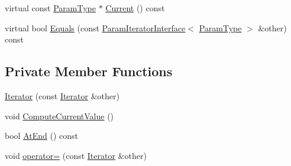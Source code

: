 \begin{DoxyCompactItemize}
\item 
virtual const \hyperlink{classtesting_1_1internal_1_1CartesianProductGenerator4_a99c0f82cb1095cf66d28100490e9fa39}{\-Param\-Type} $\ast$ \hyperlink{classtesting_1_1internal_1_1CartesianProductGenerator4_1_1Iterator_ab27aeab5db14a30f077a37989ce9261c}{\-Current} () const 
\item 
virtual bool \hyperlink{classtesting_1_1internal_1_1CartesianProductGenerator4_1_1Iterator_a8f18f9a017a12730cce28c07460bbc14}{\-Equals} (const \hyperlink{classtesting_1_1internal_1_1ParamIteratorInterface}{\-Param\-Iterator\-Interface}$<$ \hyperlink{classtesting_1_1internal_1_1CartesianProductGenerator4_a99c0f82cb1095cf66d28100490e9fa39}{\-Param\-Type} $>$ \&other) const 
\end{DoxyCompactItemize}
\subsection*{\-Private \-Member \-Functions}
\begin{DoxyCompactItemize}
\item 
\hyperlink{classtesting_1_1internal_1_1CartesianProductGenerator4_1_1Iterator_a2b76c2e597bc9393f2b99e869e4fa8d2}{\-Iterator} (const \hyperlink{classtesting_1_1internal_1_1CartesianProductGenerator4_1_1Iterator}{\-Iterator} \&other)
\item 
void \hyperlink{classtesting_1_1internal_1_1CartesianProductGenerator4_1_1Iterator_a4c18cbbef042bab72ed484f5b6923908}{\-Compute\-Current\-Value} ()
\item 
bool \hyperlink{classtesting_1_1internal_1_1CartesianProductGenerator4_1_1Iterator_a6eb9b47ffa4b10f0dca403fc597faba0}{\-At\-End} () const 
\item 
void \hyperlink{classtesting_1_1internal_1_1CartesianProductGenerator4_1_1Iterator_ac087d740f6aa05ec07afd0c5c0327105}{operator=} (const \hyperlink{classtesting_1_1internal_1_1CartesianProductGenerator4_1_1Iterator}{\-Iterator} \&other)
\end{DoxyCompactItemize}
